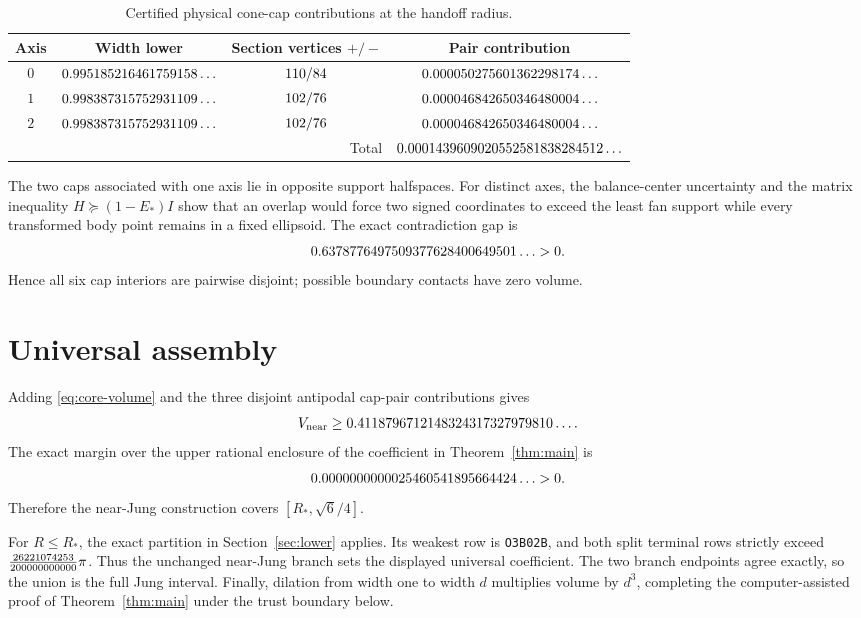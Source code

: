 \documentclass[11pt,reqno]{amsart}
\theoremstyle{remark}
\begin{document}
\begin{table}[ht]
\centering
\caption{Certified physical cone-cap contributions at the handoff radius.}
\label{tab:caps}
\begin{tabular}{@{}c c c c@{}}
\toprule
Axis & Width lower & Section vertices $+/-$ & Pair contribution\\
\midrule
$0$ & $0.995185216461759158\ldots$ & $110/84$ & $0.000050275601362298174\ldots$\\
$1$ & $0.998387315752931109\ldots$ & $102/76$ & $0.000046842650346480004\ldots$\\
$2$ & $0.998387315752931109\ldots$ & $102/76$ & $0.000046842650346480004\ldots$\\
\midrule
\multicolumn{3}{r}{Total} & $0.0001439609020552581838284512\ldots$\\
\bottomrule
\end{tabular}
\end{table}

The two caps associated with one axis lie in opposite support halfspaces.  For
distinct axes, the balance-center uncertainty and the matrix inequality
$H\succeq(1-E_*)I$ show that an overlap would force two signed coordinates to
exceed the least fan support while every transformed body point remains in a
fixed ellipsoid.  The exact contradiction gap is
\[
 0.6378776497509377628400649501\ldots>0.
\]
Hence all six cap interiors are pairwise disjoint; possible boundary contacts
have zero volume.

\section{Universal assembly}
\label{sec:assembly}

Adding \eqref{eq:core-volume} and the three disjoint antipodal cap-pair
contributions gives
\[
 V_{\rm near}\ge0.4118796712148324317327979810\ldots.
\]
The exact margin over the upper rational enclosure of the coefficient in
Theorem~\ref{thm:main} is
\[
 0.0000000000025460541895664424\ldots>0.
\]
Therefore the near-Jung construction covers
$[R_*,\sqrt6/4]$.

For $R\le R_*$, the exact partition in Section~\ref{sec:lower} applies.  Its weakest row is \texttt{O3B02B}, and both split terminal rows strictly
exceed $\frac{26221074253}{200000000000}\pi$.  Thus the unchanged near-Jung branch sets
the displayed universal coefficient.  The two branch endpoints agree exactly,
so the union is the full Jung interval.  Finally, dilation from width one to width
$d$ multiplies volume by $d^3$, completing the computer-assisted proof of
Theorem~\ref{thm:main} under the trust boundary below.
\end{document}
